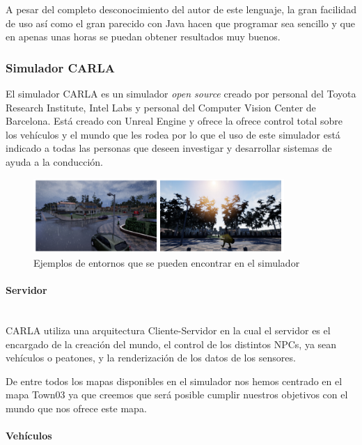 A pesar del completo desconocimiento del autor de este lenguaje, la gran facilidad de uso así como el gran parecido con Java hacen que programar sea sencillo y que en apenas unas horas se puedan obtener resultados muy buenos.



\subsubsection{Simulador CARLA}\label{sec:simuladorCARLA}

El simulador CARLA \cite{Dosovitskiy17} es un simulador \textit{open source} creado por personal del Toyota Research Institute, Intel Labs y personal del Computer Vision Center de Barcelona.
Está creado con Unreal Engine \cite{unrealengine} y ofrece la ofrece control total sobre los vehículos y el mundo que les rodea por lo que el uso de este simulador está indicado a todas las personas que deseen investigar y desarrollar sistemas de ayuda a la conducción.

\begin{figure}[h!]
    \centering
    \includegraphics[width=0.85\textwidth]{img/carla1.png}
    \caption{Ejemplos de entornos que se pueden encontrar en el simulador}
\end{figure}

\paragraph{Servidor}\mbox{}\\
CARLA utiliza una arquitectura Cliente-Servidor en la cual el servidor es el encargado de la creación del mundo, el control de los distintos NPCs, ya sean vehículos o peatones, y la renderización de los datos de los sensores.

De entre todos los mapas disponibles en el simulador nos hemos centrado en el mapa Town03 ya que creemos que será posible cumplir nuestros objetivos con el mundo que nos ofrece este mapa.

\paragraph{Vehículos}\mbox{}\\

